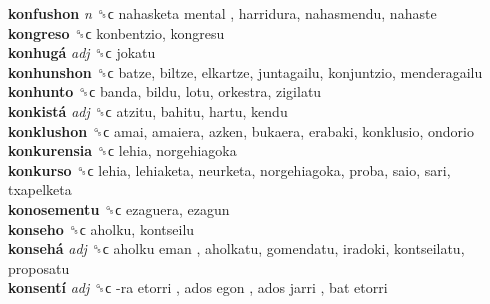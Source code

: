 \textbf{konfushon} \emph{n}  ␝ϲ   nahasketa mental , harridura, nahasmendu, nahaste  \\
\textbf{kongreso} ␝ϲ  konbentzio, kongresu  \\
\textbf{konhugá} \emph{adj}  ␝ϲ  jokatu  \\
\textbf{konhunshon} ␝ϲ  batze, biltze, elkartze, juntagailu, konjuntzio, menderagailu  \\
\textbf{konhunto} ␝ϲ  banda, bildu, lotu, orkestra, zigilatu  \\
\textbf{konkistá} \emph{adj}  ␝ϲ  atzitu, bahitu, hartu, kendu  \\
\textbf{konklushon} ␝ϲ  amai, amaiera, azken, bukaera, erabaki, konklusio, ondorio  \\
\textbf{konkurensia} ␝ϲ  lehia, norgehiagoka  \\
\textbf{konkurso} ␝ϲ  lehia, lehiaketa, neurketa, norgehiagoka, proba, saio, sari, txapelketa  \\
\textbf{konosementu} ␝ϲ  ezaguera, ezagun  \\
\textbf{konseho} ␝ϲ  aholku, kontseilu  \\
\textbf{konsehá} \emph{adj}  ␝ϲ   aholku eman , aholkatu, gomendatu, iradoki, kontseilatu, proposatu  \\
\textbf{konsentí} \emph{adj}  ␝ϲ   -ra etorri ,  ados egon ,  ados jarri ,  bat etorri   \\
